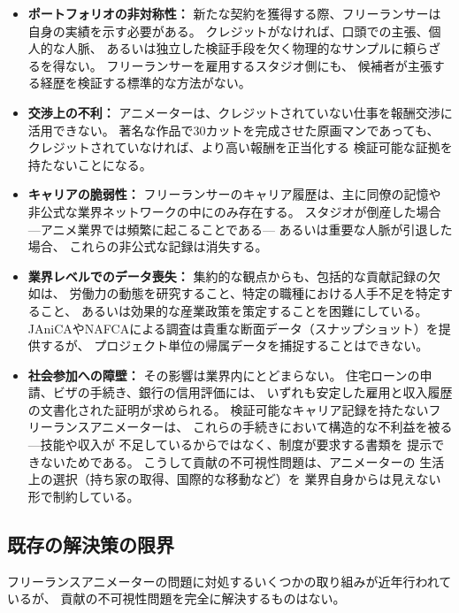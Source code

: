 \begin{itemize}
  \item \textbf{ポートフォリオの非対称性：}
    新たな契約を獲得する際、フリーランサーは自身の実績を示す必要がある。
    クレジットがなければ、口頭での主張、個人的な人脈、
    あるいは独立した検証手段を欠く物理的なサンプルに頼らざるを得ない。
    フリーランサーを雇用するスタジオ側にも、
    候補者が主張する経歴を検証する標準的な方法がない。
  \item \textbf{交渉上の不利：}
    アニメーターは、クレジットされていない仕事を報酬交渉に活用できない。
    著名な作品で30カットを完成させた原画マンであっても、
    クレジットされていなければ、より高い報酬を正当化する
    検証可能な証拠を持たないことになる。
  \item \textbf{キャリアの脆弱性：}
    フリーランサーのキャリア履歴は、主に同僚の記憶や
    非公式な業界ネットワークの中にのみ存在する。
    スタジオが倒産した場合---アニメ業界では頻繁に起こることである---
    あるいは重要な人脈が引退した場合、
    これらの非公式な記録は消失する。
  \item \textbf{業界レベルでのデータ喪失：}
    集約的な観点からも、包括的な貢献記録の欠如は、
    労働力の動態を研究すること、特定の職種における人手不足を特定すること、
    あるいは効果的な産業政策を策定することを困難にしている。
    JAniCAやNAFCAによる調査は貴重な断面データ（スナップショット）を提供するが、
    プロジェクト単位の帰属データを捕捉することはできない。
  \item \textbf{社会参加への障壁：}
    その影響は業界内にとどまらない。
    住宅ローンの申請、ビザの手続き、銀行の信用評価には、
    いずれも安定した雇用と収入履歴の文書化された証明が求められる。
    検証可能なキャリア記録を持たないフリーランスアニメーターは、
    これらの手続きにおいて構造的な不利益を被る---技能や収入が
    不足しているからではなく、制度が要求する書類を
    提示できないためである。
    こうして貢献の不可視性問題は、アニメーターの
    生活上の選択（持ち家の取得、国際的な移動など）を
    業界自身からは見えない形で制約している。
\end{itemize}

\subsection{既存の解決策の限界}
\label{subsec:existing_limitations}

フリーランスアニメーターの問題に対処するいくつかの取り組みが近年行われているが、
貢献の不可視性問題を完全に解決するものはない。


